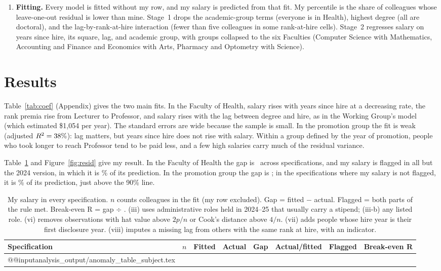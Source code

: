 \documentclass{article}
\begin{document}
\begin{enumerate}[leftmargin=*,itemsep=0em,topsep=0.2em]
    \item \textbf{Fitting.} Every model is fitted without my row, and my salary is predicted from that fit. My percentile is the share of colleagues whose leave-one-out residual is lower than mine. Stage~1 drops the academic-group terms (everyone is in Health), highest degree (all are doctoral), and the lag-by-rank-at-hire interaction (fewer than five colleagues in some rank-at-hire cells). Stage~2 regresses salary on years since hire, its square, lag, and academic group, with groups collapsed to the six Faculties (Computer Science with Mathematics, Accounting and Finance and Economics with Arts, Pharmacy and Optometry with Science).
\end{enumerate}


\section*{Results}

Table~\ref{tab:coef} (Appendix) gives the two main fits. In the Faculty of Health, salary rises with years since hire at a decreasing rate, the rank premia rise from Lecturer to Professor, and salary rises with the lag between degree and hire, as in the Working Group's model (which estimated \$1{,}054 per year). The standard errors are wide because the sample is small. In the promotion group the fit is weak (adjusted $R^2 = 38\%$): lag matters, but years since hire does not rise with salary. Within a group defined by the year of promotion, people who took longer to reach Professor tend to be paid less, and a few high salaries carry much of the residual variance.


Table~\ref{tab:subject} and Figure~\ref{fig:resid} give my result. In the Faculty of Health the gap is \GapRangeOne\ across specifications, and my salary is flagged in all but the 2024 version, in which it is \OneiRatio\% of its prediction. In the promotion group the gap is \GapRangeTwo; in the specifications where my salary is not flagged, it is \RatioRangeTwoUnflagged\% of its prediction, just above the 90\% line.

\begin{table}[H]
\centering
\footnotesize
\setlength{\tabcolsep}{4pt}
\begin{tabular}{lrrrrrcr}
\toprule
Specification & $n$ & Fitted & Actual & Gap & Actual/fitted & Flagged & Break-even R \\
\midrule
\csname @@input\endcsname analysis_output/anomaly_table_subject.tex 
\bottomrule
\end{tabular}
\caption{My salary in every specification. $n$ counts colleagues in the fit (my row excluded). Gap = fitted $-$ actual. Flagged = both parts of the rule met. Break-even R = gap $\div$ \WGRCoef. (iii) uses administrative roles held in 2024--25 that usually carry a stipend; (iii-b) any listed role. (vi) removes observations with hat value above $2p/n$ or Cook's distance above $4/n$. (vii) adds people whose hire year is their first disclosure year. (viii) imputes a missing lag from others with the same rank at hire, with an indicator.}
\label{tab:subject}
\end{table}
\end{document}
